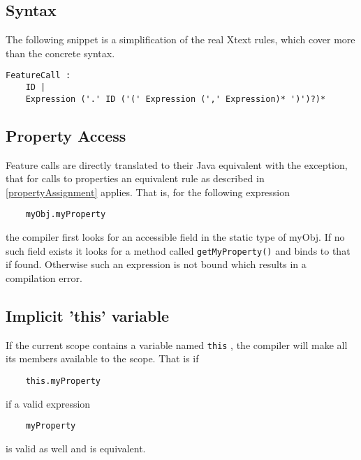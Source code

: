 \documentclass[a4paper,10pt]{scrreprt}
\begin{document}
\subsection{Syntax}
The following snippet is a simplification of the real Xtext rules, which cover more than the concrete syntax.
\begin{lstlisting}
FeatureCall :
	ID |
	Expression ('.' ID ('(' Expression (',' Expression)* ')')?)*

\end{lstlisting}





\subsection{Property Access\label{PropertyAccess}}
Feature calls are directly translated to their Java equivalent with the exception, that for calls to properties an equivalent rule as described in 
\autoref{propertyAssignment} applies. 
That is, for the following expression

\begin{lstlisting}
	myObj.myProperty

\end{lstlisting}


the compiler first looks for an accessible field in the static type of myObj. If no such field exists it looks for a method called \lstinline{getMyProperty()}
 and binds to that if found.
Otherwise such an expression is not bound which results in a compilation error.




\subsection{Implicit 'this' variable\label{ImplicitThis}}
If the current scope contains a variable named \lstinline{this}
, the compiler will make all its members available to the scope. 
That is if 
\begin{lstlisting}
	this.myProperty

\end{lstlisting}

if a valid expression
\begin{lstlisting}
	myProperty

\end{lstlisting}

is valid as well and is equivalent. 
\end{document}
